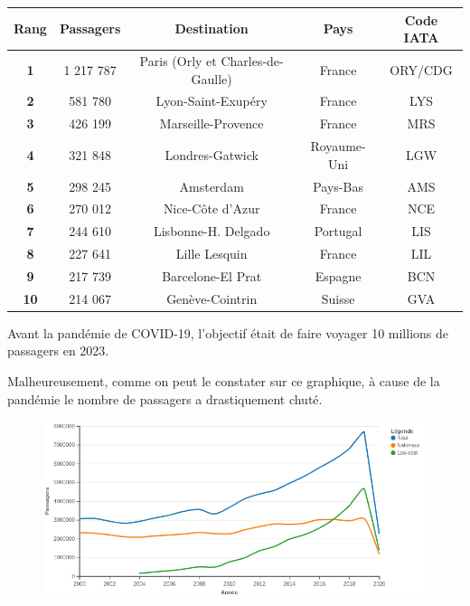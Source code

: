 \begin{table}[hbt!]
  \centering
  \begin{tabular}{|c|c|c|c|c|}
  \hline
  \textbf{Rang} & \textbf{Passagers} & \textbf{Destination}              & \textbf{Pays} & \textbf{Code IATA} \\ \hline
  \textbf{1}    & 1 217 787          & Paris (Orly et Charles-de-Gaulle) & France        & ORY/CDG            \\ \hline
  \textbf{2}    & 581 780            & Lyon-Saint-Exupéry                & France        & LYS                \\ \hline
  \textbf{3}    & 426 199            & Marseille-Provence                & France        & MRS                \\ \hline
  \textbf{4}    & 321 848            & Londres-Gatwick                   & Royaume-Uni   & LGW                \\ \hline
  \textbf{5}    & 298 245            & Amsterdam                         & Pays-Bas      & AMS                \\ \hline
  \textbf{6}    & 270 012            & Nice-Côte d'Azur                  & France        & NCE                \\ \hline
  \textbf{7}    & 244 610            & Lisbonne-H. Delgado               & Portugal      & LIS                \\ \hline
  \textbf{8}    & 227 641            & Lille Lesquin                     & France        & LIL                \\ \hline
  \textbf{9}    & 217 739            & Barcelone-El Prat                 & Espagne       & BCN                \\ \hline
  \textbf{10}   & 214 067            & Genève-Cointrin                   & Suisse        & GVA                \\ \hline
  \end{tabular}
\end{table}

Avant la pandémie de COVID-19, l'objectif était de faire voyager 10 millions de passagers en 2023.

Malheureusement, comme on peut le constater sur ce graphique, à cause de la pandémie le nombre de passagers a drastiquement chuté.\newline

\begin{figure}[hbt!]
  \centering
  \includegraphics[width=16cm]{Images/passagers.png}
  \label{fig:trafic}
\end{figure}


